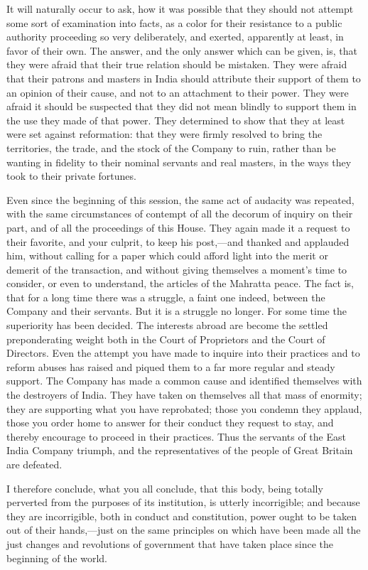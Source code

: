It will naturally occur to ask, how it was possible that they should not attempt some sort of examination into facts, as a color for their resistance to a public authority proceeding so very deliberately, and exerted, apparently at least, in favor of their own. The answer, and the only answer which can be given, is, that they were afraid that their true relation should be mistaken. They were afraid that their patrons and masters in India should attribute their support of them to an opinion of their cause, and not to an attachment to their power. They were afraid it should be suspected that they did not mean blindly to support them in the use they made of that power. They determined to show that they at least were set against reformation: that they were firmly resolved to bring the territories, the trade, and the stock of the Company to ruin, rather than be wanting in fidelity to their nominal servants and real masters, in the ways they took to their private fortunes.

Even since the beginning of this session, the same act of audacity was repeated, with the same circumstances of contempt of all the decorum of inquiry on their part, and of all the proceedings of this House. They again made it a request to their favorite, and your culprit, to keep his post,—and thanked and applauded him, without calling for a paper which could afford light into the merit or demerit of the transaction, and without giving themselves a moment's time to consider, or even to understand, the articles of the Mahratta peace. The fact is, that for a long time there was a struggle, a faint one indeed, between the Company and their servants. But it is a struggle no longer. For some time the superiority has been decided. The interests abroad are become the settled preponderating weight both in the Court of Proprietors and the Court of Directors. Even the attempt you have made to inquire into their practices and to reform abuses has raised and piqued them to a far more regular and steady support. The Company has made a common cause and identified themselves with the destroyers of India. They have taken on themselves all that mass of enormity; they are supporting what you have reprobated; those you condemn they applaud, those you order home to answer for their conduct they request to stay, and thereby encourage to proceed in their practices. Thus the servants of the East India Company triumph, and the representatives of the people of Great Britain are defeated.

I therefore conclude, what you all conclude, that this body, being totally perverted from the purposes of its institution, is utterly incorrigible; and because they are incorrigible, both in conduct and constitution, power ought to be taken out of their hands,—just on the same principles on which have been made all the just changes and revolutions of government that have taken place since the beginning of the world.

